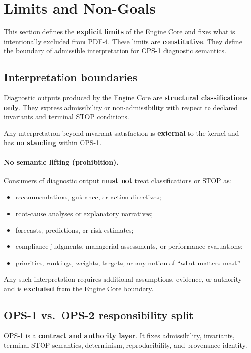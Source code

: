 ﻿\section{Limits and Non-Goals}

This section defines the \textbf{explicit limits} of the Engine Core and
fixes what is intentionally excluded from PDF-4.
These limits are \textbf{constitutive}.
They define the boundary of admissible interpretation
for OPS-1 diagnostic semantics.

\subsection{Interpretation boundaries}

Diagnostic outputs produced by the Engine Core are
\textbf{structural classifications only}.
They express admissibility or non-admissibility
with respect to declared invariants
and terminal STOP conditions.

Any interpretation beyond invariant satisfaction
is \textbf{external} to the kernel
and has \textbf{no standing} within OPS-1.

\paragraph{No semantic lifting (prohibition).}
Consumers of diagnostic output \textbf{must not}
treat classifications or STOP as:
\begin{itemize}
  \item recommendations, guidance, or action directives;
  \item root-cause analyses or explanatory narratives;
  \item forecasts, predictions, or risk estimates;
  \item compliance judgments, managerial assessments,
        or performance evaluations;
  \item priorities, rankings, weights, targets,
        or any notion of ``what matters most''.
\end{itemize}

Any such interpretation requires additional assumptions,
evidence, or authority and is \textbf{excluded}
from the Engine Core boundary.

\subsection{OPS-1 vs.\ OPS-2 responsibility split}

OPS-1 is a \textbf{contract and authority layer}.
It fixes admissibility, invariants,
terminal STOP semantics,
determinism, reproducibility,
and provenance identity.

